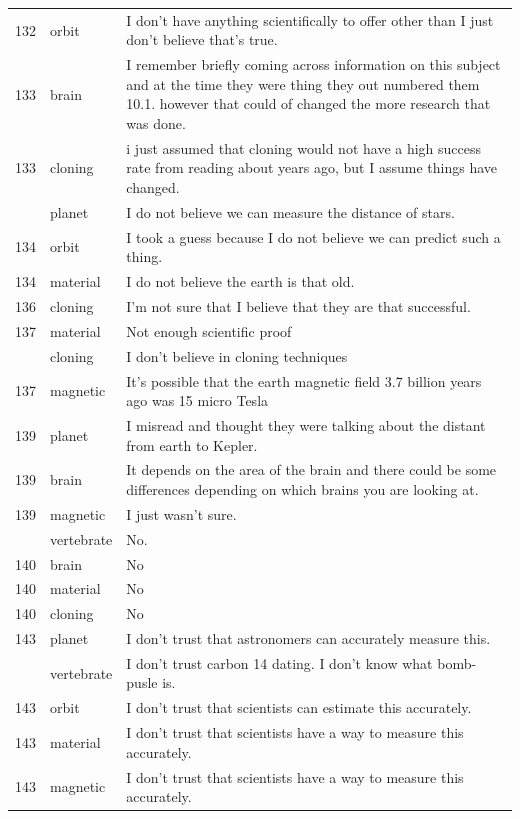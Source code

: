 \documentclass[
  doc,floatsintext]{apa6}
\begin{document}
\begin{longtable}[t]{>{}r>{}l>{\raggedright\arraybackslash}p{30em}}
132 & orbit & I don't have anything scientifically to offer other than I just don't believe that's true.\\
133 & brain & I remember briefly coming across information on this subject and at the time they were thing they out numbered them 10.1. however that could of changed the more research that was done.\\
133 & cloning & i just assumed that cloning would not have a high success rate from reading about years ago, but I assume things have changed.\\
\addlinespace
134 & planet & I do not believe we can measure the distance of stars.\\
134 & orbit & I took a guess because I do not believe we can predict such a thing.\\
134 & material & I do not believe the earth is that old.\\
136 & cloning & I’m not sure that I believe that they are that successful.\\
137 & material & Not enough scientific proof\\
\addlinespace
137 & cloning & I don't believe in cloning techniques\\
137 & magnetic & It's possible that the earth magnetic field 3.7 billion years ago was 15 micro Tesla\\
139 & planet & I misread and thought they were talking about the distant from earth to Kepler.\\
139 & brain & It depends on the area of the brain and there could be some differences depending on which brains you are looking at.\\
139 & magnetic & I just wasn't sure.\\
\addlinespace
140 & vertebrate & No.\\
140 & brain & No\\
140 & material & No\\
140 & cloning & No\\
143 & planet & I don't trust that astronomers can accurately measure this.\\
\addlinespace
143 & vertebrate & I don't trust carbon 14 dating. I don't know what bomb-pusle is.\\
143 & orbit & I don't trust that scientists can estimate this accurately.\\
143 & material & I don't trust that scientists have a way to measure this accurately.\\
143 & magnetic & I don't trust that scientists have a way to measure this accurately.\\

\end{longtable}
\end{document}
